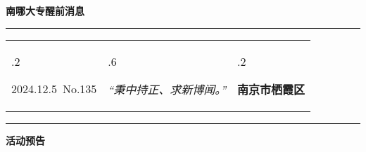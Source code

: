 \documentclass[letterpaper, 12pt]{article}
\begin{document}
\begin{center}
    \Huge\textbf{南哪大专醒前消息}
\end{center}
\vspace{4mm}
\hrule
\renewcommand\tabularxcolumn[1]{m{#1}}
\begin{tabularx}{\textwidth}{>{\hsize.2\hsize}X>{\hsize.6\hsize}X>{\hsize.2\hsize}X}
    \begin{flushleft}
        2024.12.5\, No.135
    \end{flushleft}
    &
    \begin{center}
        \textit{“秉中持正、求新博闻。”}
    \end{center}
    &
    \begin{flushright}
        \textbf{南京市栖霞区}
    \end{flushright}
\end{tabularx}
\vspace{-3.5mm}
\hrule
\vspace{4mm}
\centerline{\huge\textbf{活动预告}}
\end{document}
